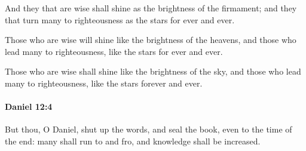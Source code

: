			\begin{versebox}
					\item[BHS] 
					\item[LXX] 
					\item[ASV] And they that are wise shall shine as the brightness of the firmament; and they that turn many to righteousness as the stars for ever and ever.
					\item[NIV] Those who are wise will shine like the brightness of the heavens, and those who lead many to righteousness, like the stars for ever and ever.
					\item[NRSV] Those who are wise shall shine like the brightness of the sky, and those who lead many to righteousness, like the stars forever and ever.
			\end{versebox}

		\paragraph{Daniel 12:4} %
			\label{DANIEL-12-4}

			But thou, O Daniel, shut up the words, and seal the book, even to the time of the end: many shall run to and fro, and knowledge shall be increased.

